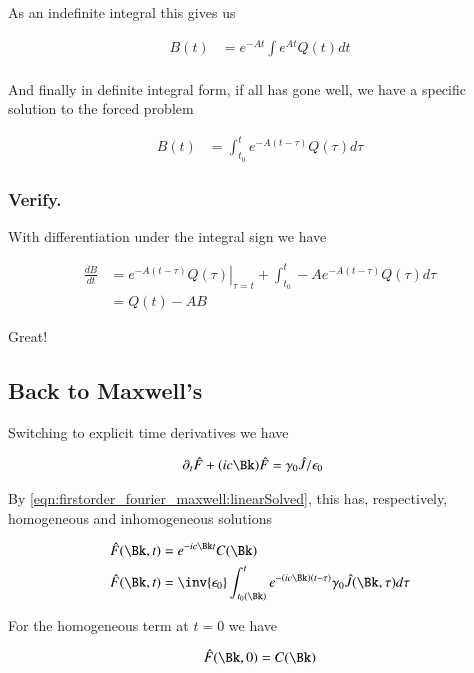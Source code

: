 As an indefinite integral this gives us

\begin{align*}
B(t)
&= e^{-At} \int e^{A t} Q(t) dt \\
\end{align*}

And finally in definite integral form,
if all has gone well, we have a specific solution to the forced problem

\begin{align}\label{eqn:firstorder_fourier_maxwell:linearSolved}
B(t) &= \int_{t_0}^{t} e^{-A (t -\tau)} Q(\tau) d\tau 
\end{align}

\subsubsection{Verify. }

With differentiation under the integral sign we have

\begin{align*}
\frac{dB}{dt} 
&={\left. e^{-A (t -\tau)} Q(\tau) \right\vert}_{\tau=t} + \int_{t_0}^{t} -A e^{-A (t -\tau)} Q(\tau) d\tau \\
&= Q(t) - A B
\end{align*}

Great!

\subsection{Back to Maxwell's }

Switching to explicit time derivatives we have

\begin{align*}
\partial_t \hat{F} + (i c \Bk) \hat{F} &= \gamma_0 \hat{J}/ \epsilon_0
\end{align*}

By \ref{eqn:firstorder_fourier_maxwell:linearSolved}, this has, respectively, homogeneous and inhomogeneous solutions 

\begin{align}\label{eqn:firstorder_fourier_maxwell:waveNumberDomain}
\hat{F}(\Bk,t) &= e^{-i c \Bk t} C(\Bk) \\
\hat{F}(\Bk,t) &= \inv{\epsilon_0} \int_{t_0(\Bk)}^{t} e^{-(i c \Bk) (t -\tau)} \gamma_0 \hat{J}(\Bk,\tau) d\tau 
\end{align}

For the homogeneous term at $t=0$ we have

\begin{align*}
\hat{F}(\Bk,0) &= C(\Bk) \\
\end{align*}


